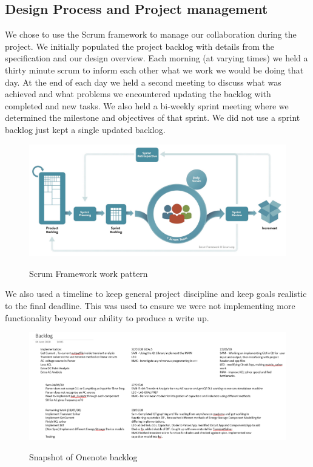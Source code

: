 \documentclass{article}
\begin{document}
\subsection{Design Process and Project management}

We chose to use the Scrum framework to manage our collaboration during the project. We initially populated the project backlog with details from the specification and our design overview. Each morning (at varying times) we held a thirty minute scrum to inform each other what we work we would be doing that day. At the end of each day we held a second meeting to discuss what was achieved and what problems we encountered updating the backlog with completed and new tasks.
We also held a bi-weekly sprint meeting where we determined the milestone and objectives of that sprint. We did not use a sprint backlog just kept a single updated backlog. 

\begin{figure}[h]
    \caption{Scrum Framework work pattern}
    \centering
    \includegraphics[width=\textwidth]{images/ScrumFramework.jpg}
    \label{fig:Scrum}
\end{figure}
We also used a timeline to keep general project discipline and keep goals realistic to the final deadline. This was used to ensure we were not implementing more functionality beyond our ability to produce a write up.
\begin{figure}[h]
    \caption{Snapshot of Onenote backlog}
    \centering
    \includegraphics[width=12cm]{images/Backlog.PNG}
    \label{fig:BackLog}
\end{figure}
\end{document}

